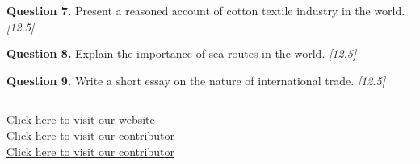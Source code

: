 \documentclass[11pt,a4paper]{article}
\newcommand{\pts}[1]{\hfill   \textit{[#1]}}
\begin{document}
\medskip


\noindent   \textbf{Question 7.} Present a reasoned account of cotton textile industry in the world. \pts{12.5}

\medskip


\noindent   \textbf{Question 8.} Explain the importance of sea routes in the world. \pts{12.5}

\medskip


\noindent   \textbf{Question 9.} Write a short essay on the nature of international trade. \pts{12.5}

\vfill\rule{\linewidth}{0.4pt}

\begin{center}\small
\href{https://bhu-exam.vercel.app/}{Click here to visit our website}\\[4pt]
\href{https://me-aryan.vercel.app/}{Click here to visit our contributor}\\[4pt]
\href{https://quashan-me.vercel.app/}{Click here to visit our contributor}
\end{center}
\end{document}
